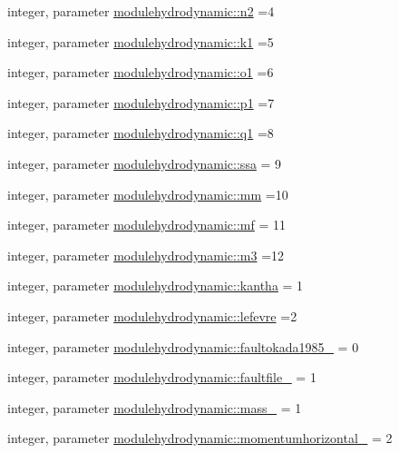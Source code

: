 \begin{DoxyCompactItemize}
\item 
integer, parameter \mbox{\hyperlink{namespacemodulehydrodynamic_ad52f8d0ca42bda8666eb541a80a51811}{modulehydrodynamic\+::n2}} =4
\item 
integer, parameter \mbox{\hyperlink{namespacemodulehydrodynamic_a8d9b473a6e3cc46ce774fb7f2da43a3c}{modulehydrodynamic\+::k1}} =5
\item 
integer, parameter \mbox{\hyperlink{namespacemodulehydrodynamic_a9fde36bccaa577eb6b1066809bde6cba}{modulehydrodynamic\+::o1}} =6
\item 
integer, parameter \mbox{\hyperlink{namespacemodulehydrodynamic_a1ec23a4af80aafae4e087f9b5e363ef8}{modulehydrodynamic\+::p1}} =7
\item 
integer, parameter \mbox{\hyperlink{namespacemodulehydrodynamic_a374f80ca0e210e3d7443cae0d41863e4}{modulehydrodynamic\+::q1}} =8
\item 
integer, parameter \mbox{\hyperlink{namespacemodulehydrodynamic_a71be04b6d80f12710d26ec5aaacf1b1e}{modulehydrodynamic\+::ssa}} = 9
\item 
integer, parameter \mbox{\hyperlink{namespacemodulehydrodynamic_aa749f16ba28072624f0bf31e67115191}{modulehydrodynamic\+::mm}} =10
\item 
integer, parameter \mbox{\hyperlink{namespacemodulehydrodynamic_a14a180093abeed1a30ddebab114060f6}{modulehydrodynamic\+::mf}} = 11
\item 
integer, parameter \mbox{\hyperlink{namespacemodulehydrodynamic_aa0588e2ae1eb1f5acf28a2925399061c}{modulehydrodynamic\+::m3}} =12
\item 
integer, parameter \mbox{\hyperlink{namespacemodulehydrodynamic_a172edede8072ba59ab0880ae9ce4b128}{modulehydrodynamic\+::kantha}} = 1
\item 
integer, parameter \mbox{\hyperlink{namespacemodulehydrodynamic_a62625835225de0a2df2625e9f7639119}{modulehydrodynamic\+::lefevre}} =2
\item 
integer, parameter \mbox{\hyperlink{namespacemodulehydrodynamic_a35bdaf12b19ad1e6e7cc5a904f76f07e}{modulehydrodynamic\+::faultokada1985\+\_\+}} = 0
\item 
integer, parameter \mbox{\hyperlink{namespacemodulehydrodynamic_a22c3cb09207699a1cb89faf979baa68a}{modulehydrodynamic\+::faultfile\+\_\+}} = 1
\item 
integer, parameter \mbox{\hyperlink{namespacemodulehydrodynamic_a95ba96c7e6b2991a960242c61fc67d71}{modulehydrodynamic\+::mass\+\_\+}} = 1
\item 
integer, parameter \mbox{\hyperlink{namespacemodulehydrodynamic_aa2a5497af9ce00e73311b74d9612da51}{modulehydrodynamic\+::momentumhorizontal\+\_\+}} = 2

\end{DoxyCompactItemize}
